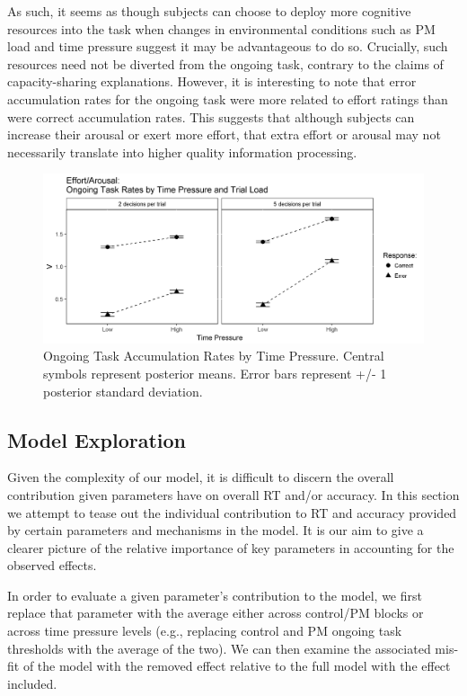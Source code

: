 \documentclass[11pt,]{article}
\begin{document}
As such, it seems as though subjects can choose to deploy more cognitive
resources into the task when changes in environmental conditions such as
PM load and time pressure suggest it may be advantageous to do so.
Crucially, such resources need not be diverted from the ongoing task,
contrary to the claims of capacity-sharing explanations. However, it is
interesting to note that error accumulation rates for the ongoing task
were more related to effort ratings than were correct accumulation
rates. This suggests that although subjects can increase their arousal
or exert more effort, that extra effort or arousal may not necessarily
translate into higher quality information processing.

\begin{figure}
\includegraphics[width=0.8\linewidth]{figures/E1/E1.Effort.Arousal.TP} \caption{\label{fig:Effort.Arousal.TP}Ongoing Task Accumulation Rates by Time Pressure. Central symbols represent posterior means. Error bars represent +/- 1 posterior standard deviation.}\label{fig:Plot: Effort/Arousal}
\end{figure}

\subsection{Model Exploration}\label{model-exploration}

Given the complexity of our model, it is difficult to discern the
overall contribution given parameters have on overall RT and/or
accuracy. In this section we attempt to tease out the individual
contribution to RT and accuracy provided by certain parameters and
mechanisms in the model. It is our aim to give a clearer picture of the
relative importance of key parameters in accounting for the observed
effects.

In order to evaluate a given parameter's contribution to the model, we
first replace that parameter with the average either across control/PM
blocks or across time pressure levels (e.g., replacing control and PM
ongoing task thresholds with the average of the two). We can then
examine the associated mis-fit of the model with the removed effect
relative to the full model with the effect included.
\end{document}
